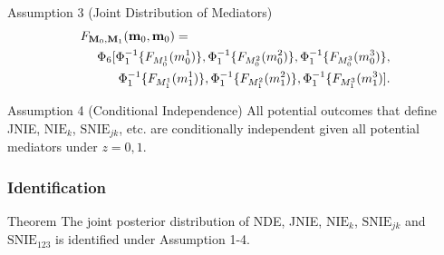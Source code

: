 \documentclass{beamer}
\begin{document}
\begin{frame}
\begin{block}{Assumption 3 (Joint Distribution of Mediators)}
\begin{eqnarray*}
\lefteqn{F_{\mathbf{M}_0,\mathbf{M}_1}(\mathbf{m}_0,\mathbf{m}_0)=}\\
& &\Phi_6 [\Phi_1^{-1}\{F_{M_0^1}(m_0^1)\},\Phi_1^{-1}\{F_{M_0^2}(m_0^2)\},\Phi_1^{-1}\{F_{M_0^3}(m_0^3)\},\\
& & \qquad \Phi_1^{-1}\{F_{M_1^1}(m_1^1)\},\Phi_1^{-1}\{F_{M_1^2}(m_1^2)\},\Phi_1^{-1}\{F_{M_1^3}(m_1^3)].
\end{eqnarray*}
\end{block}
\begin{block}{Assumption 4 (Conditional Independence)}
All potential outcomes that define JNIE, $\text{NIE}_k$, $\text{SNIE}_{jk}$, etc. are conditionally independent given all potential mediators under $z=0,1$.
\end{block}

\end{frame}



\begin{frame}
\frametitle{Identification}
\begin{block}{Theorem}
The joint posterior distribution of NDE, JNIE, $\text{NIE}_k$, $\text{SNIE}_{jk}$ and $\text{SNIE}_{123}$ is identified under Assumption 1-4. 
\end{block}
\end{frame}



\end{document}
